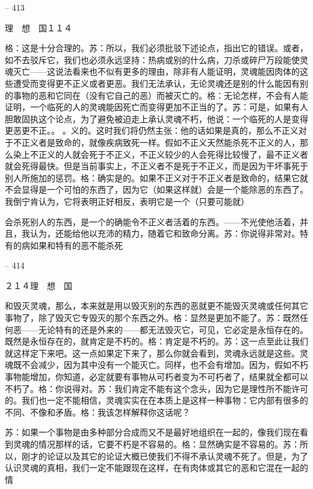 \documentclass[11pt,oneside]{book}
\begin{document}
\begin{common-format}
    

-- 413

    理　想　国１１４

    格：这是十分合理的。苏：所以，我们必须批驳下述论点，指出它的错误。或者，如不去驳斥它，我们也必须永远坚持：热病或别的什么病，刀杀或碎尸万段能使灵魂灭亡——这说法看来也不似有更多的理由，除非有人能证明，灵魂能因肉体的这些遭受而变得更不正义或者更恶。我们无法承认，无论灵魂还是别的什么能因有别的事物的恶和它同在（没有它自己的恶）而被灭亡的。格：无论怎样，不会有人能证明，一个临死的人的灵魂能因死亡而变得更加不正当的了。苏：可是，如果有人胆敢固执这个论点，为了避免被迫走上承认灵魂不朽，他说：一个临死的人是变得更恶更不正。。                                        。义的。这时我们将仍然主张：他的话如果是真的，那么不正义对于不正义者是致命的，就像疾病致死一样。假如不正义天然能杀死不正义的人，那么染上不正义的人就会死于不正义，不正义较少的人会死得比较慢了，最不正义者就会死得最快。但是当前事实上，不正义者不是死于不正义，而是因为干坏事死于别人所施加的惩罚。格：确实是的。如果不正义对于不正义者是致命的，结果它就不会显得是一个可怕的东西了，因为它（如果这样就）会是一个能除恶的东西了。我倒宁肯认为，它将表明正好相反，表明它是一个（只要可能就）

    会杀死别人的东西，是一个的确能令不正义者活着的东西。——不光使他活着，并且，我认为，还能给他以充沛的精力，随着它和致命分离。苏：你说得非常对。特有的病如果和特有的恶不能杀死

    

-- 414

    ２１４理　想　国

    和毁灭灵魂，那么，本来就是用以毁灭别的东西的恶就更不能毁灭灵魂或任何其它事物了，除了毁灭它专毁灭的那个东西之外。格：显然是更加不能了。苏：既然任何恶——无论特有的还是外来的——都无法毁灭它，可见，它必定是永恒存在的。既然是永恒存在的，就肯定是不朽的。格：肯定是不朽的。苏：这一点至此让我们就这样定下来吧。这一点如果定下来了，那么你就会看到，灵魂永远就是这些。灵魂既不会减少，因为其中没有一个能灭亡。同样，也不会有增加。因为，假如不朽事物能增加，你知道，必定就要有事物从可朽者变为不可朽者了，结果就全都可以不朽了。格：你说得对。苏：我们肯定不能有这个念头，因为它是理性所不能许可的。我们也一定不能相信，灵魂实实在在本质上是这样一种事物：它内部有很多的不同、不像和矛盾。格：我该怎样解释你这话呢？

    苏：如果一个事物是由多种部分合成而又不是最好地组织在一起的，像我们现在看到灵魂的情况那样的话，它要不朽是不容易的。格：显然确实是不容易的。苏：所以，刚才的论证以及其它的论证大概已使我们不得不承认灵魂不死了。但是，为了认识灵魂的真相，我们一定不能跟现在这样，在有肉体或其它的恶和它混在一起的情


\end{common-format}
\end{document}
